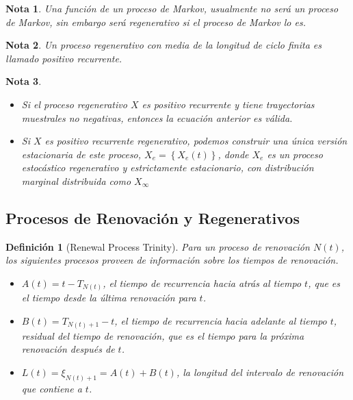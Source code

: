 \documentclass{article}
\newtheorem{Def}{Definición}[section]
\newtheorem{Note}{Nota}[section]
\numberwithin{equation}{section}
\begin{document}
\begin{Note}
Una funci\'on de un proceso de Markov, usualmente no ser\'a un proceso de Markov, sin embargo ser\'a regenerativo si el proceso de Markov lo es.
\end{Note}

\begin{Note}
Un proceso regenerativo con media de la longitud de ciclo finita es llamado positivo recurrente.
\end{Note}

\begin{Note}
\begin{itemize}
\item[a)] Si el proceso regenerativo $X$ es positivo recurrente y tiene trayectorias muestrales no negativas, entonces la ecuaci\'on anterior es v\'alida.
\item[b)] Si $X$ es positivo recurrente regenerativo, podemos construir una \'unica versi\'on estacionaria de este proceso, $X_{e}=\left\{X_{e}\left(t\right)\right\}$, donde $X_{e}$ es un proceso estoc\'astico regenerativo y estrictamente estacionario, con distribuci\'on marginal distribuida como $X_{\infty}$
\end{itemize}
\end{Note}

%
\subsection*{Procesos de Renovaci\'on y Regenerativos}
%

\begin{Def}[Renewal Process Trinity]
Para un proceso de renovaci\'on $N\left(t\right)$, los siguientes procesos proveen de informaci\'on sobre los tiempos de renovaci\'on.
\begin{itemize}
\item $A\left(t\right)=t-T_{N\left(t\right)}$, el tiempo de recurrencia hacia atr\'as al tiempo $t$, que es el tiempo desde la \'ultima renovaci\'on para $t$.

\item $B\left(t\right)=T_{N\left(t\right)+1}-t$, el tiempo de recurrencia hacia adelante al tiempo $t$, residual del tiempo de renovaci\'on, que es el tiempo para la pr\'oxima renovaci\'on despu\'es de $t$.

\item $L\left(t\right)=\xi_{N\left(t\right)+1}=A\left(t\right)+B\left(t\right)$, la longitud del intervalo de renovaci\'on que contiene a $t$.
\end{itemize}
\end{Def}
\end{document}
